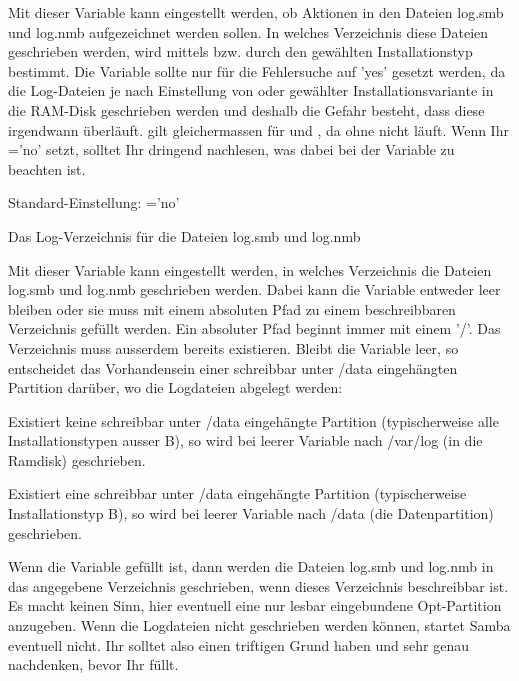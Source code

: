 \begin{description}
    Mit dieser Variable kann eingestellt werden, ob Aktionen in den Dateien
    log.smb und log.nmb aufgezeichnet werden sollen. In welches Verzeichnis
    diese Dateien geschrieben werden, wird mittels 
    bzw. durch den gewählten Installationstyp bestimmt. Die Variable sollte nur
    für die Fehlersuche auf 'yes' gesetzt werden, da die Log-Dateien je nach
    Einstellung von  oder gewählter
    Installationsvariante in die RAM-Disk geschrieben werden und deshalb die
    Gefahr besteht, dass diese irgendwann überläuft.  gilt
    gleichermassen für  und ,
    da  ohne  nicht läuft.
    Wenn Ihr ='no' setzt, solltet Ihr dringend nachlesen, was
    dabei bei der Variable  zu beachten ist.

    Standard-Einstellung: ='no'



    Das Log-Verzeichnis für die Dateien log.smb und log.nmb

    Mit dieser Variable kann eingestellt werden, in welches Verzeichnis die
    Dateien log.smb und log.nmb geschrieben werden. Dabei kann die Variable
    entweder leer bleiben oder sie muss mit einem absoluten Pfad zu einem
    beschreibbaren Verzeichnis gefüllt werden. Ein absoluter Pfad beginnt immer
    mit einem '/'. Das Verzeichnis muss ausserdem bereits existieren.
    Bleibt die Variable leer, so entscheidet das Vorhandensein einer schreibbar
    unter /data eingehängten Partition darüber, wo die Logdateien abgelegt
    werden:

    Existiert keine schreibbar unter /data eingehängte Partition
    (typischerweise alle Installationstypen ausser B), so wird bei leerer
    Variable  nach /var/log (in die Ramdisk) geschrieben.

    Existiert eine schreibbar unter /data eingehängte Partition
    (typischerweise Installationstyp B), so wird bei leerer Variable
     nach /data (die Datenpartition) geschrieben.

    Wenn die Variable gefüllt ist, dann werden die Dateien log.smb und log.nmb
    in das angegebene Verzeichnis geschrieben, wenn dieses Verzeichnis
    beschreibbar ist. Es macht keinen Sinn, hier eventuell eine nur lesbar
    eingebundene Opt-Partition anzugeben. Wenn die Logdateien nicht geschrieben
    werden können, startet Samba eventuell nicht. Ihr solltet also einen
    triftigen Grund haben und sehr genau nachdenken, bevor Ihr 
    füllt.


\end{description}
